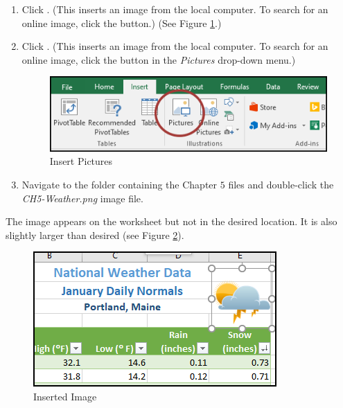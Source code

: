 \begin{enumbox}
	\begin{enumerate}
		\item {} Click . (This inserts an image from the local computer. To search for an online image, click the  button.) (See Figure \ref{05:fig28}.)
		\item {} Click . (This inserts an image from the local computer. To search for an online image, click the  button in the \textit{Pictures} drop-down menu.)

		\begin{figure}[H]
			\centering
			\includegraphics[width=\maxwidth{.95\linewidth}]{gfx/ch05_fig28}
			\caption{Insert Pictures}
			\label{05:fig28}
		\end{figure}

		\item Navigate to the folder containing the Chapter $ 5 $ files and double-click the \textit{CH5-Weather.png} image file.
	\end{enumerate}
\end{enumbox}

The image appears on the worksheet but not in the desired location. It is also slightly larger than desired (see Figure \ref{05:fig29}).

\begin{figure}[H]
	\centering
	\includegraphics[width=\maxwidth{.95\linewidth}]{gfx/ch05_fig29}
	\caption{Inserted Image}
	\label{05:fig29}
\end{figure}

